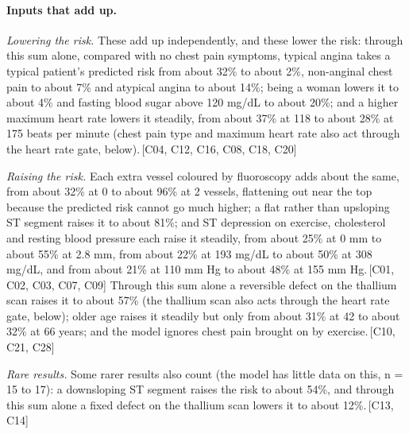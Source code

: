 \documentclass[a4paper,10pt]{article}
\newif\ifreviewmarks
\newcommand{\reviewrule}{\noindent{\color{BrickRed}\rule{\linewidth}{0.8pt}}}
\newenvironment{drafted}[1][]{%
  \ifreviewmarks\par\addvspace{\medskipamount}\reviewrule\par\nopagebreak
  \noindent{\color{BrickRed}\sffamily\footnotesize\textbf{Thesis Draft}\quad #1\hfill review}\par\nopagebreak\smallskip\fi}{%
  \ifreviewmarks\par\smallskip\noindent{\color{BrickRed}\sffamily\footnotesize end of thesis draft}\par\nopagebreak\reviewrule\par\medskip\fi}
\begin{document}
\begin{drafted}[plain-language layer: heart-s2-c2]
\paragraph{Inputs that add up.} \par\noindent\textit{Lowering the risk.}  These add up independently, and these lower the risk: through this sum alone, compared with no chest pain symptoms, typical angina takes a typical patient's predicted risk from about 32\% to about 2\%, non-anginal chest pain to about 7\% and atypical angina to about 14\%; being a woman lowers it to about 4\% and fasting blood sugar above 120 mg/dL to about 20\%; and a higher maximum heart rate lowers it steadily, from about 37\% at 118 to about 28\% at 175 beats per minute (chest pain type and maximum heart rate also act through the heart rate gate, below).\,{\scriptsize\textcolor{NavyBlue}{[C04, C12, C16, C08, C18, C20]}} \par\noindent\textit{Raising the risk.}  Each extra vessel coloured by fluoroscopy adds about the same, from about 32\% at 0 to about 96\% at 2 vessels, flattening out near the top because the predicted risk cannot go much higher; a flat rather than upsloping ST segment raises it to about 81\%; and ST depression on exercise, cholesterol and resting blood pressure each raise it steadily, from about 25\% at 0 mm to about 55\% at 2.8 mm, from about 22\% at 193 mg/dL to about 50\% at 308 mg/dL, and from about 21\% at 110 mm Hg to about 48\% at 155 mm Hg.\,{\scriptsize\textcolor{NavyBlue}{[C01, C02, C03, C07, C09]}} Through this sum alone a reversible defect on the thallium scan raises it to about 57\% (the thallium scan also acts through the heart rate gate, below); older age raises it steadily but only from about 31\% at 42 to about 32\% at 66 years; and the model ignores chest pain brought on by exercise.\,{\scriptsize\textcolor{NavyBlue}{[C10, C21, C28]}} \par\noindent\textit{Rare results.}  Some rarer results also count (the model has little data on this, n = 15 to 17): a downsloping ST segment raises the risk to about 54\%, and through this sum alone a fixed defect on the thallium scan lowers it to about 12\%.\,{\scriptsize\textcolor{NavyBlue}{[C13, C14]}}

\end{drafted}
\end{document}
